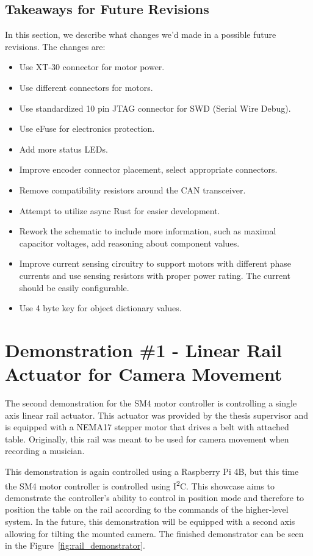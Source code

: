\subsection{Takeaways for Future Revisions}
\label{subsec:final_takeaways}
In this section, we describe what changes we'd made in a possible future revisions.
The changes are:
\begin{itemize}
    \item Use XT-30 connector for motor power.
    \item Use different connectors for motors.
    \item Use standardized 10 pin JTAG connector for SWD (Serial Wire Debug).
    \item Use eFuse for electronics protection.
    \item Add more status LEDs.
    \item Improve encoder connector placement, select appropriate connectors.
    \item Remove compatibility resistors around the CAN transceiver.
    \item Attempt to utilize async Rust for easier development.
    \item Rework the schematic to include more information, such as maximal capacitor voltages, add reasoning about component values.
    \item Improve current sensing circuitry to support motors with different phase currents and use sensing resistors with proper power rating. The current should be easily configurable.
    \item Use 4 byte key for object dictionary values.
\end{itemize}

\section{Demonstration \#1 - Linear Rail Actuator for Camera Movement}
\label{sec:dem2}
The second demonstration for the SM4 motor controller is controlling a single axis linear rail actuator.
This actuator was provided by the thesis supervisor and is equipped with a NEMA17 stepper motor that drives a belt with attached table.
Originally, this rail was meant to be used for camera movement when recording a musician.

This demonstration is again controlled using a Raspberry Pi 4B, but this time the SM4 motor controller is controlled using I\textsuperscript{2}C.
This showcase aims to demonstrate the controller's ability to control in position mode and therefore to position the table on the rail according to the commands of the higher-level system.
In the future, this demonstration will be equipped with a second axis allowing for tilting the mounted camera.
The finished demonstrator can be seen in the Figure~\ref{fig:rail_demonstrator}.

